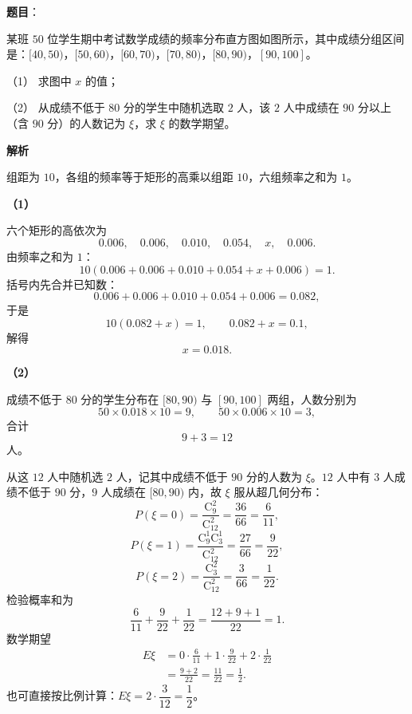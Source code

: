 \begin{answer}

\textbf{题目}：

某班 $50$ 位学生期中考试数学成绩的频率分布直方图如图所示，其中成绩分组区间是：$[40,50)$，$[50,60)$，$[60,70)$，$[70,80)$，$[80,90)$，$[90,100]$。
\nopagebreak[4]
\begin{center}\end{center}
\nopagebreak[4]
（1） 求图中 $x$ 的值；

（2） 从成绩不低于 $80$ 分的学生中随机选取 $2$ 人，该 $2$ 人中成绩在 $90$ 分以上（含 $90$ 分）的人数记为 $\xi$，求 $\xi$ 的数学期望。

\textbf{解析}

组距为 $10$，各组的频率等于矩形的高乘以组距 $10$，六组频率之和为 $1$。

\textbf{（1）}

六个矩形的高依次为
\nopagebreak[4]
\[0.006,\quad0.006,\quad0.010,\quad0.054,\quad x,\quad0.006.\]
由频率之和为 $1$：
\nopagebreak[4]
\[10(0.006+0.006+0.010+0.054+x+0.006)=1.\]
括号内先合并已知数：
\nopagebreak[4]
\[0.006+0.006+0.010+0.054+0.006=0.082,\]
于是
\nopagebreak[4]
\[10(0.082+x)=1,\qquad 0.082+x=0.1,\]
解得
\nopagebreak[4]
\[x=0.018.\]

\textbf{（2）}

成绩不低于 $80$ 分的学生分布在 $[80,90)$ 与 $[90,100]$ 两组，人数分别为
\nopagebreak[4]
\[50\times0.018\times10=9,\qquad 50\times0.006\times10=3,\]
合计
\nopagebreak[4]
\[9+3=12\]
人。

从这 $12$ 人中随机选 $2$ 人，记其中成绩不低于 $90$ 分的人数为 $\xi$。$12$ 人中有 $3$ 人成绩不低于 $90$ 分，$9$ 人成绩在 $[80,90)$ 内，故 $\xi$ 服从超几何分布：
\nopagebreak[4]
\[P(\xi=0)=\frac{\mathrm C_9^2}{\mathrm C_{12}^2}=\frac{36}{66}=\frac6{11},\]
\nopagebreak[4]
\[P(\xi=1)=\frac{\mathrm C_9^1\mathrm C_3^1}{\mathrm C_{12}^2}=\frac{27}{66}=\frac9{22},\]
\nopagebreak[4]
\[P(\xi=2)=\frac{\mathrm C_3^2}{\mathrm C_{12}^2}=\frac3{66}=\frac1{22}.\]
检验概率和为
\nopagebreak[4]
\[\frac6{11}+\frac9{22}+\frac1{22}=\frac{12+9+1}{22}=1.\]
数学期望
\nopagebreak[4]
\[\begin{aligned}
E\xi&=0\cdot\frac6{11}+1\cdot\frac9{22}+2\cdot\frac1{22}\\
&=\frac{9+2}{22}=\frac{11}{22}=\frac12.
\end{aligned}\]
也可直接按比例计算：$E\xi=2\cdot\dfrac3{12}=\dfrac12$。



\end{answer}
